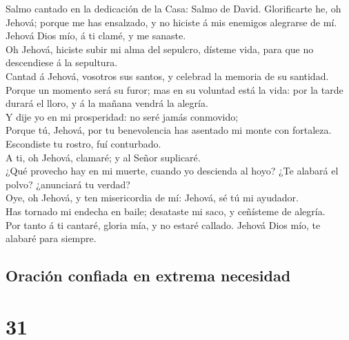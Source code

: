  Salmo cantado en la dedicación de la Casa: Salmo de
David. Glorificarte he, oh Jehová; porque me has ensalzado, y no hiciste
á mis enemigos alegrarse de mí.\\
 Jehová Dios mío, á ti clamé, y me sanaste.\\
 Oh Jehová, hiciste subir mi alma del sepulcro, dísteme
vida, para que no descendiese á la sepultura.\\
 Cantad á Jehová, vosotros sus santos, y celebrad la
memoria de su santidad.\\
 Porque un momento será su furor; mas en su voluntad está
la vida: por la tarde durará el lloro, y á la mañana vendrá la
alegría.\\
 Y dije yo en mi prosperidad: no seré jamás conmovido;\\
 Porque tú, Jehová, por tu benevolencia has asentado mi
monte con fortaleza. Escondiste tu rostro, fuí conturbado.\\
 A ti, oh Jehová, clamaré; y al Señor suplicaré.\\
 ¿Qué provecho hay en mi muerte, cuando yo descienda al
hoyo? ¿Te alabará el polvo? ¿anunciará tu verdad?\\
 Oye, oh Jehová, y ten misericordia de mí: Jehová, sé tú
mi ayudador.\\
 Has tornado mi endecha en baile; desataste mi saco, y
ceñísteme de alegría.\\
 Por tanto á ti cantaré, gloria mía, y no estaré callado.
Jehová Dios mío, te alabaré para siempre.

\hypertarget{oraciuxf3n-confiada-en-extrema-necesidad}{%
\subsection{Oración confiada en extrema
necesidad}\label{oraciuxf3n-confiada-en-extrema-necesidad}}

\hypertarget{section-30}{%
\section{31}\label{section-30}}

